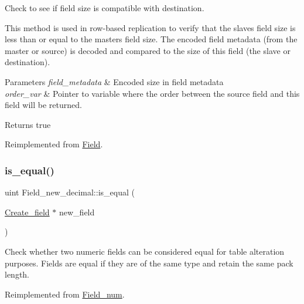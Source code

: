 Check to see if field size is compatible with destination.

This method is used in row-\/based replication to verify that the slave\textquotesingle{}s field size is less than or equal to the master\textquotesingle{}s field size. The encoded field metadata (from the master or source) is decoded and compared to the size of this field (the slave or destination).


\begin{DoxyParams}{Parameters}
{\em field\+\_\+metadata} & Encoded size in field metadata \\
\hline
{\em order\+\_\+var} & Pointer to variable where the order between the source field and this field will be returned.\\
\hline
\end{DoxyParams}
\begin{DoxyReturn}{Returns}
{\ttfamily true} 
\end{DoxyReturn}


Reimplemented from \mbox{\hyperlink{classField_ab603b7f21a9116358e400dd7282cee50}{Field}}.

\mbox{\label{classField__new__decimal_a322bc9ecdcf1ffab0787b933fac016d9}} 
\subsubsection{\texorpdfstring{is\+\_\+equal()}{is\_equal()}}
{\footnotesize\ttfamily uint Field\+\_\+new\+\_\+decimal\+::is\+\_\+equal (\begin{DoxyParamCaption}\item[{\mbox{\hyperlink{classCreate__field}{Create\+\_\+field}} $\ast$}]{new\+\_\+field }\end{DoxyParamCaption})\hspace{0.3cm}{\ttfamily [virtual]}}

Check whether two numeric fields can be considered \textquotesingle{}equal\textquotesingle{} for table alteration purposes. Fields are equal if they are of the same type and retain the same pack length. 

Reimplemented from \mbox{\hyperlink{classField__num_af9c9a23de2d14eceaeb96f1f98212ed4}{Field\+\_\+num}}.

\mbox{\label{classField__new__decimal_a10b28a60684090afc6b4c44dcad8c975}} 
